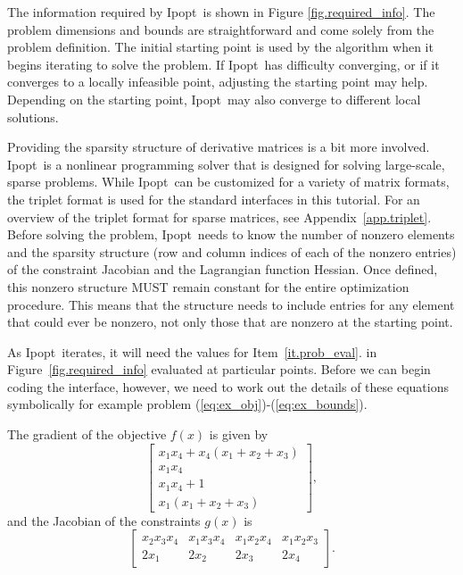 \documentclass[10pt]{article}
\newcommand{\Ipopt}{{\sc Ipopt}}
\begin{document}
The information required by \Ipopt\ is shown in Figure
\ref{fig.required_info}. The problem dimensions and bounds are
straightforward and come solely from the problem definition. The
initial starting point is used by the algorithm when it begins
iterating to solve the problem. If \Ipopt\ has difficulty converging, or
if it converges to a locally infeasible point, adjusting the starting
point may help.  Depending on the starting point, \Ipopt\ may also
converge to different local solutions.

Providing the sparsity structure of derivative matrices is a bit more
involved. \Ipopt\ is a nonlinear programming solver that is designed
for solving large-scale, sparse problems. While \Ipopt\ can be
customized for a variety of matrix formats, the triplet format is used
for the standard interfaces in this tutorial. For an overview of the
triplet format for sparse matrices, see Appendix~\ref{app.triplet}.
Before solving the problem, \Ipopt\ needs to know the number of
nonzero elements and the sparsity structure (row and column indices of
each of the nonzero entries) of the constraint Jacobian and the
Lagrangian function Hessian. Once defined, this nonzero structure MUST
remain constant for the entire optimization procedure. This means that
the structure needs to include entries for any element that could ever
be nonzero, not only those that are nonzero at the starting point.

As \Ipopt\ iterates, it will need the values for
Item~\ref{it.prob_eval}. in Figure~\ref{fig.required_info} evaluated at
particular points. Before we can begin coding the interface, however,
we need to work out the details of these equations symbolically for
example problem (\ref{eq:ex_obj})-(\ref{eq:ex_bounds}).

The gradient of the objective $f(x)$ is given by
\[%
\left[
\begin{array}{c}
x_1 x_4 + x_4 (x_1 + x_2 + x_3) \\
x_1 x_4 \\
x_1 x_4 + 1 \\
x_1 (x_1 + x_2 + x_3)
\end{array}
\right],
\]%
and the Jacobian of the constraints $g(x)$ is
\[%
\left[
\begin{array}{cccc}
x_2 x_3 x_4     & x_1 x_3 x_4   & x_1 x_2 x_4   & x_1 x_2 x_3   \\
2 x_1           & 2 x_2         & 2 x_3         & 2 x_4
\end{array}
\right].
\]%
\end{document}
